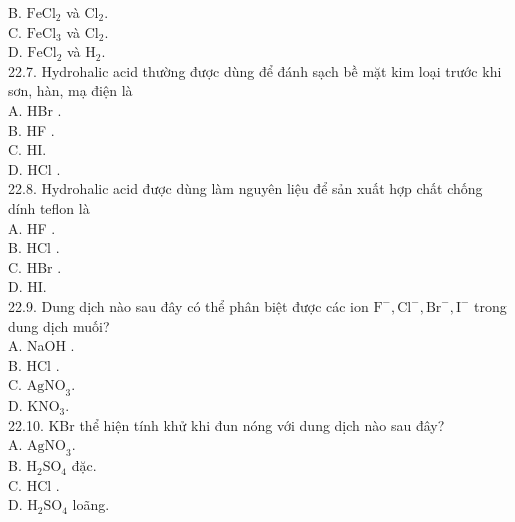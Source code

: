 \documentclass[10pt]{article}
\begin{document}
B. $\mathrm{FeCl}_{2}$ và $\mathrm{Cl}_{2}$.\\
C. $\mathrm{FeCl}_{3}$ và $\mathrm{Cl}_{2}$.\\
D. $\mathrm{FeCl}_{2}$ và $\mathrm{H}_{2}$.\\
22.7. Hydrohalic acid thường được dùng để đánh sạch bề mặt kim loại trước khi sơn, hàn, mạ điện là\\
A. HBr .\\
B. HF .\\
C. HI.\\
D. HCl .\\
22.8. Hydrohalic acid được dùng làm nguyên liệu để sản xuất hợp chất chống dính teflon là\\
A. HF .\\
B. HCl .\\
C. HBr .\\
D. HI.\\
22.9. Dung dịch nào sau đây có thể phân biệt được các ion $\mathrm{F}^{-}, \mathrm{Cl}^{-}, \mathrm{Br}^{-}, \mathrm{I}^{-}$ trong dung dịch muối?\\
A. NaOH .\\
B. HCl .\\
C. $\mathrm{AgNO}_{3}$.\\
D. $\mathrm{KNO}_{3}$.\\
22.10. KBr thể hiện tính khử khi đun nóng với dung dịch nào sau đây?\\
A. $\mathrm{AgNO}_{3}$.\\
B. $\mathrm{H}_{2} \mathrm{SO}_{4}$ đặc.\\
C. HCl .\\
D. $\mathrm{H}_{2} \mathrm{SO}_{4}$ loãng.
\end{document}
